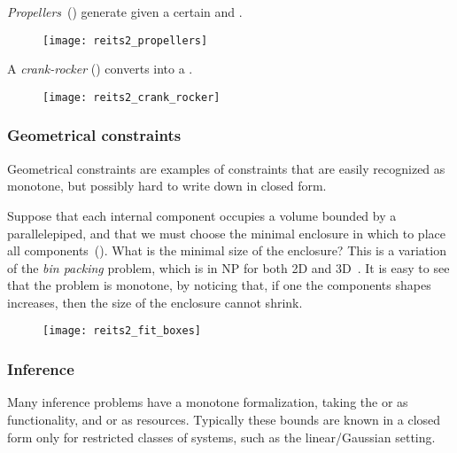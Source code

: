 \begin{example}
\emph{Propellers}~() generate 
given a certain  and .
\end{example}

\begin{figure}[h!]
    \centering
    \texttt{[image: reits2\_propellers]}
\caption{} \label{fig:propeller}
\end{figure}

\begin{example}
A \emph{crank-rocker} () converts  into a .
\end{example}

\begin{figure}[h!] 
    \centering
    \texttt{[image: reits2\_crank\_rocker]}
    \caption{
        \label{fig:crack}}
    \end{figure}

\subsubsection{Geometrical constraints}

Geometrical constraints are examples of constraints that are easily
recognized as monotone, but possibly hard to write down in closed
form.

\begin{example}
Suppose that each internal component occupies a volume
bounded by a parallelepiped, and that we must choose the minimal enclosure
in which to place all components~(). What
is the minimal size of the enclosure? This is a variation of the \emph{bin
packing} problem, which is in NP for both 2D and 3D~\cite{lodi02two}.
It is easy to see that the problem is monotone, by noticing that,
if one the components shapes increases, then the size of the enclosure
cannot shrink.
\end{example}

\begin{figure}[h]
    \centering
\texttt{[image: reits2\_fit\_boxes]}
\caption{\label{fig:packing}}
\end{figure}


\subsubsection{Inference}

Many inference problems have a monotone formalization, taking the
 or  as functionality, and 
or  as resources. Typically these bounds are known in
a closed form only for restricted classes of systems, such as the
linear/Gaussian setting.


